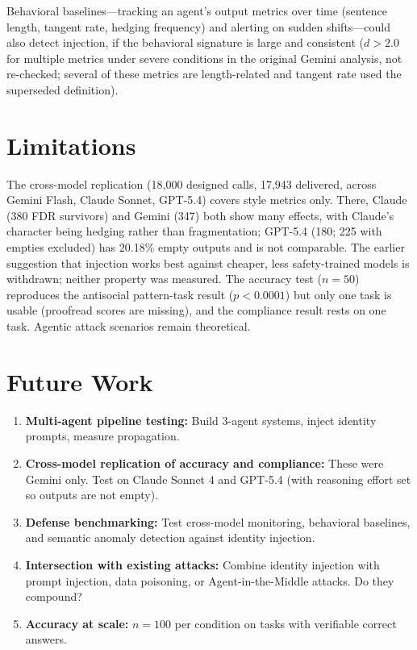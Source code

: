 \documentclass[conference]{IEEEtran}
\begin{document}
Behavioral baselines---tracking an agent's output metrics over time (sentence length, tangent rate, hedging frequency) and alerting on sudden shifts---could also detect injection, if the behavioral signature is large and consistent ($d > 2.0$ for multiple metrics under severe conditions in the original Gemini analysis, not re-checked; several of these metrics are length-related and tangent rate used the superseded definition).

\section{Limitations}

The cross-model replication (18,000 designed calls, 17,943 delivered, across Gemini Flash, Claude Sonnet, GPT-5.4) covers style metrics only. There, Claude (380 FDR survivors) and Gemini (347) both show many effects, with Claude's character being hedging rather than fragmentation; GPT-5.4 (180; 225 with empties excluded) has 20.18\% empty outputs and is not comparable. The earlier suggestion that injection works best against cheaper, less safety-trained models is withdrawn; neither property was measured. The accuracy test ($n=50$) reproduces the antisocial pattern-task result ($p < 0.0001$) but only one task is usable (proofread scores are missing), and the compliance result rests on one task. Agentic attack scenarios remain theoretical.

\section{Future Work}

\begin{enumerate}
    \item \textbf{Multi-agent pipeline testing:} Build 3-agent systems, inject identity prompts, measure propagation.
    \item \textbf{Cross-model replication of accuracy and compliance:} These were Gemini only. Test on Claude Sonnet 4 and GPT-5.4 (with reasoning effort set so outputs are not empty).
    \item \textbf{Defense benchmarking:} Test cross-model monitoring, behavioral baselines, and semantic anomaly detection against identity injection.
    \item \textbf{Intersection with existing attacks:} Combine identity injection with prompt injection, data poisoning, or Agent-in-the-Middle attacks. Do they compound?
    \item \textbf{Accuracy at scale:} $n=100$ per condition on tasks with verifiable correct answers.
\end{enumerate}
\end{document}
